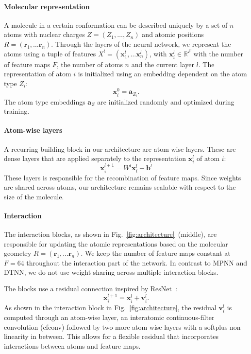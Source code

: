 \documentclass{article}
\newcommand{\rr}{\mathbf{r}}
\newcommand{\x}{\mathbf{x}}
\newcommand{\ba}{\mathbf{a}}
\newcommand{\vv}{\mathbf{v}}
\begin{document}
\paragraph{Molecular representation}
A molecule in a certain conformation can be described uniquely by a set of $n$ atoms with nuclear charges $Z=(Z_1, \dots, Z_n)$ and atomic positions $R=(\rr_1, \dots \rr_n)$.
Through the layers of the neural network, we represent the atoms using a tuple of features $X^l= (\x_1^l, \dots \x_n^l)$, with $\x^l_i \in \mathbb{R}^F$ with the number of feature maps $F$, the number of atoms $n$ and the current layer $l$.
The representation of atom $i$  is initialized using an embedding dependent on the atom type $Z_i$:
\begin{equation}
\x^0_i = \ba_{Z_i}.
\end{equation}
The atom type embeddings $\ba_Z$ are initialized randomly and optimized during training. 

\paragraph{Atom-wise layers}
A recurring building block in our architecture are atom-wise layers.
These are dense layers that are applied separately to the representation $\x^{l}_i$ of atom $i$:
\[
\x^{l+1}_i = W^l \x^{l}_i + \mathbf{b}^l
\]
These layers is responsible for the recombination of feature maps.
Since weights are shared across atoms, our architecture remains scalable with respect to the size of the molecule.

\paragraph{Interaction}
The interaction blocks, as shown in Fig.~\ref{fig:architecture}~(middle), are responsible for updating the atomic representations based on the molecular geometry $R=(\rr_1, \dots \rr_n)$. 
We keep the number of feature maps constant at $F=64$ throughout the interaction part of the network.
In contrast to MPNN and DTNN, we do not use weight sharing across multiple interaction blocks.

The blocks use a residual connection inspired by ResNet~\citep{he2016deep}:
\[
\x_i^{l+1} = \x_i^{l} + \vv_i^{l}.
\]
As shown in the interaction block in Fig.~\ref{fig:architecture}, the residual $\vv_i^l$ is computed through an atom-wise layer, an interatomic continuous-filter convolution (cfconv) followed by two more atom-wise layers with a softplus non-linearity in between.
This allows for a flexible residual that incorporates interactions between atoms and feature maps.
\end{document}
